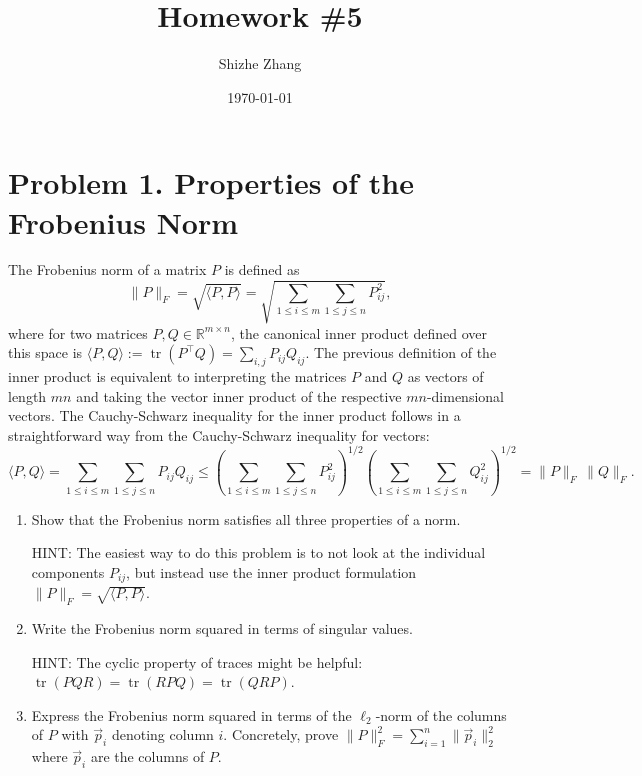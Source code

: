 \documentclass[
  12pt,
]{fphw}
\title{Homework \#5} %
\author{Shizhe Zhang} %
\date{\today} %
\institute{University of California, Berkeley \\ Department of Statistics} %
\begin{document}
\maketitle %

\section*{Problem 1. Properties of the Frobenius Norm}
The Frobenius norm of a matrix $P$ is defined as
\[
\|P\|_F = \sqrt{\langle P, P\rangle} =
\sqrt{\sum_{1\le i\le m}\sum_{1\le j\le n} P_{ij}^2}, \tag{1}
\]
where for two matrices $P, Q \in \mathbb{R}^{m\times n}$, the canonical inner product defined over this space is
$\langle P, Q\rangle := \operatorname{tr}\!\left(P^\top Q\right) = \sum_{i,j} P_{ij}Q_{ij}$.
The previous definition of the inner product is equivalent to interpreting the matrices
$P$ and $Q$ as vectors of length $mn$ and taking the vector inner product of the respective $mn$-dimensional vectors.
The Cauchy-Schwarz inequality for the inner product follows in a straightforward way from the Cauchy-Schwarz
inequality for vectors:
\[
\langle P, Q\rangle =
\sum_{1\le i\le m}\sum_{1\le j\le n} P_{ij}Q_{ij}
\le
\left(\sum_{1\le i\le m}\sum_{1\le j\le n} P_{ij}^2\right)^{1/2}
\left(\sum_{1\le i\le m}\sum_{1\le j\le n} Q_{ij}^2\right)^{1/2}
= \|P\|_F \, \|Q\|_F. \tag{2}
\]

\begin{enumerate}
\item[(a)] Show that the Frobenius norm satisfies all three properties of a norm.

HINT: The easiest way to do this problem is to not look at the individual components $P_{ij}$, but instead use
the inner product formulation $\|P\|_F = \sqrt{\langle P, P\rangle}$.

\item[(b)] Write the Frobenius norm squared in terms of singular values.

HINT: The cyclic property of traces might be helpful: $\operatorname{tr}(PQR) = \operatorname{tr}(RPQ) = \operatorname{tr}(QRP)$.

\item[(c)] Express the Frobenius norm squared in terms of the $\ell_2$-norm of the columns of $P$ with $\vec p_i$ denoting column
$i$. Concretely, prove $\|P\|_F^2 = \sum_{i=1}^n \|\vec p_i\|_2^2$ where $\vec p_i$ are the columns of $P$.
\end{enumerate}
\end{document}

